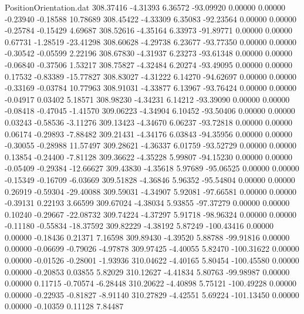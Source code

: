 \begin{filecontents}{PositionOrientation.dat}
 308.37416   -4.31393    6.36572   -93.09920    0.00000    0.00000   -0.23940   -0.18588   10.78689
 308.45422   -4.33309    6.35083   -92.23564    0.00000    0.00000   -0.25784   -0.15429    4.69687
 308.52616   -4.35164    6.33973   -91.89771    0.00000    0.00000    0.67731   -1.28519  -23.41298
 308.60628   -4.29738    6.23677   -93.77350    0.00000    0.00000   -0.30542   -0.05599    2.22196
 308.67830   -4.31937    6.23273   -93.61348    0.00000    0.00000   -0.06840   -0.37506    1.53217
 308.75827   -4.32484    6.20274   -93.49095    0.00000    0.00000    0.17532   -0.83389  -15.77827
 308.83027   -4.31222    6.14270   -94.62697    0.00000    0.00000   -0.33169   -0.03784   10.77963
 308.91031   -4.33877    6.13967   -93.76424    0.00000    0.00000   -0.04917    0.03402    5.18571
 308.98230   -4.34231    6.14212   -93.39090    0.00000    0.00000   -0.08418   -0.47045   -1.41570
 309.06223   -4.34904    6.10452   -93.50406    0.00000    0.00000    0.03243   -0.58536   -3.11276
 309.13423   -4.34670    6.06237   -93.72818    0.00000    0.00000    0.06174   -0.29893   -7.88482
 309.21431   -4.34176    6.03843   -94.35956    0.00000    0.00000   -0.30055   -0.28988   11.57497
 309.28621   -4.36337    6.01759   -93.52729    0.00000    0.00000    0.13854   -0.24400   -7.81128
 309.36622   -4.35228    5.99807   -94.15230    0.00000    0.00000   -0.05409   -0.29384  -12.66627
 309.43830   -4.35618    5.97689   -95.06525    0.00000    0.00000   -0.15349   -0.16709   -6.03669
 309.51828   -4.36846    5.96352   -95.54804    0.00000    0.00000    0.26919   -0.59304  -29.40088
 309.59031   -4.34907    5.92081   -97.66581    0.00000    0.00000   -0.39131    0.22193    3.66599
 309.67024   -4.38034    5.93855   -97.37279    0.00000    0.00000    0.10240   -0.29667  -22.08732
 309.74224   -4.37297    5.91718   -98.96324    0.00000    0.00000   -0.11180   -0.55834  -18.37592
 309.82229   -4.38192    5.87249  -100.43416    0.00000    0.00000   -0.18436    0.21371    7.16598
 309.89430   -4.39520    5.88788   -99.91816    0.00000    0.00000   -0.06699   -0.79026   -4.97878
 309.97425   -4.40055    5.82470  -100.31622    0.00000    0.00000   -0.01526   -0.28001   -1.93936
 310.04622   -4.40165    5.80454  -100.45580    0.00000    0.00000   -0.20853    0.03855    5.82029
 310.12627   -4.41834    5.80763   -99.98987    0.00000    0.00000    0.11715   -0.70574   -6.28448
 310.20622   -4.40898    5.75121  -100.49228    0.00000    0.00000   -0.22935   -0.81827   -8.91140
 310.27829   -4.42551    5.69224  -101.13450    0.00000    0.00000   -0.10359    0.11128    7.84487

\end{filecontents}
